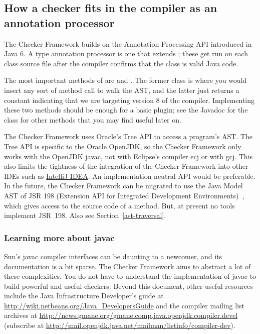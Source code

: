 \subsection{How a checker fits in the compiler as an annotation processor\label{checker-as-annotation-processor}}

The Checker Framework builds on the Annotation Processing API
introduced in Java 6.  A type annotation processor is one that extends
; these get run on each class
source file after the compiler confirms that the class is valid Java code.

The most important methods of 
are  and . The former
class is where you would insert any sort of method call to walk the AST\@,
and the latter just returns a constant indicating that we are targeting
version 8 of the compiler. Implementing these two methods should be enough
for a basic plugin; see the Javadoc for the class for other methods that
you may find useful later on.

The Checker Framework uses Oracle's Tree API to access a program's AST\@.
The Tree API is specific to the Oracle OpenJDK, so the Checker Framework only
works with the OpenJDK javac, not with Eclipse's compiler ecj or with
\href{http://gcc.gnu.org/java/}{gcj}.  This also limits the tightness of
the integration of the Checker Framework into other IDEs such as \href{http://www.jetbrains.com/idea/}{IntelliJ IDEA}\@.
An implementation-neutral API would be preferable.
In the future, the Checker Framework
can be migrated to use the Java Model AST of JSR 198 (Extension API for
Integrated Development Environments)~\cite{JSR198}, which gives access to
the source code of a method.  But, at present no tools
implement JSR~198.  Also see Section~\ref{ast-traversal}.



\subsubsection{Learning more about javac\label{learning-more-about-javac}}

Sun's javac compiler interfaces can be daunting to a
newcomer, and its documentation is a bit sparse. The Checker Framework
aims to abstract a lot of these complexities.
You do not have to understand the implementation of javac to
build powerful and useful checkers.
Beyond this document,
other useful resources include the Java Infrastructure
Developer's guide at
\url{http://wiki.netbeans.org/Java_DevelopersGuide} and the compiler
mailing list archives at
\url{http://news.gmane.org/gmane.comp.java.openjdk.compiler.devel}
(subscribe at
\url{http://mail.openjdk.java.net/mailman/listinfo/compiler-dev}).


